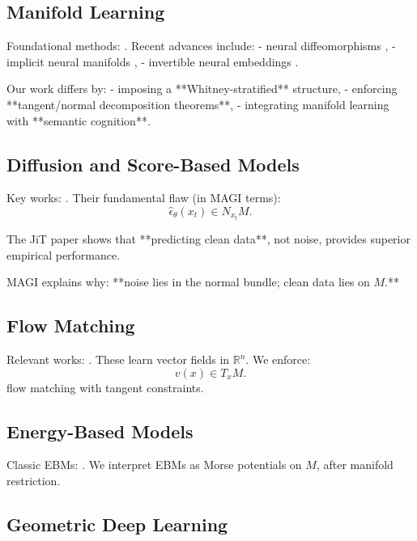 \documentclass[11pt,a4paper,twocolumn]{article}
\begin{document}
\subsection{Manifold Learning}

Foundational methods:  
\cite{tenenbaum2000isomap, roweis2000lle, belkin2003laplacianeigenmaps}.  
Recent advances include:
- neural diffeomorphisms \cite{chen2018neuralode},
- implicit neural manifolds \cite{dupont2022implicitmanifold},
- invertible neural embeddings \cite{behrmann2019invertible}.

Our work differs by:
- imposing a **Whitney-stratified** structure,
- enforcing **tangent/normal decomposition theorems**,  
- integrating manifold learning with **semantic cognition**.

\subsection{Diffusion and Score-Based Models}

Key works:  
\cite{ho2020denoising, song2021scorebased, nichol2021improved}.  
Their fundamental flaw (in MAGI terms):
\[
\widehat{\epsilon}_\theta(x_t) \in N_{x_t} M.
\]

The JiT paper \cite{li2025backtobasics} shows that **predicting clean
data**, not noise, provides superior empirical performance.

MAGI explains why:  
**noise lies in the normal bundle; clean data lies on $M$.**

\subsection{Flow Matching}

Relevant works:
\cite{lipman2023flow, tong2023flowmatching}.  
These learn vector fields in $\mathbb{R}^n$.  
We enforce:
\[
v(x) \in T_x M.
\]
flow matching with tangent constraints.

\subsection{Energy-Based Models}

Classic EBMs:
\cite{lecun2006ebm, du2019ebm}.  
We interpret EBMs as Morse potentials on $M$, after manifold restriction.

\subsection{Geometric Deep Learning}
\end{document}
